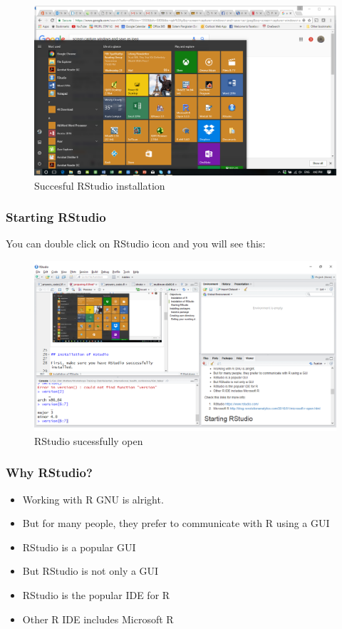\documentclass[]{book}
\providecommand{\tightlist}{%
  \setlength{\itemsep}{0pt}\setlength{\parskip}{0pt}}
\theoremstyle{definition}
\theoremstyle{definition}
\theoremstyle{remark}
\begin{document}
\begin{figure}
\centering
\includegraphics{R.png}
\caption{Succesful RStudio installation}
\end{figure}

\subsubsection{Starting RStudio}\label{starting-rstudio}

You can double click on RStudio icon and you will see this:

\begin{figure}
\centering
\includegraphics{rstudio.png}
\caption{RStudio sucessfully open}
\end{figure}

\subsubsection{Why RStudio?}\label{why-rstudio}

\begin{itemize}
\tightlist
\item
  Working with R GNU is alright.
\item
  But for many people, they prefer to communicate with R using a GUI
\item
  RStudio is a popular GUI
\item
  But RStudio is not only a GUI
\item
  RStudio is the popular IDE for R
\item
  Other R IDE includes Microsoft R
\end{itemize}
\end{document}
